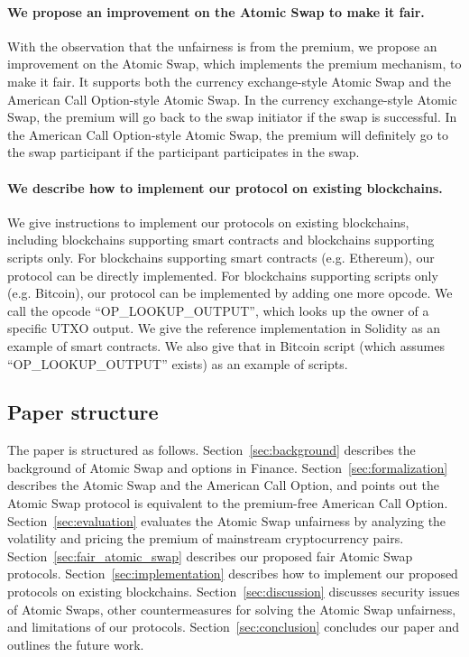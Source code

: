 \paragraph{We propose an improvement on the Atomic Swap to make it fair.}
With the observation that the unfairness is from the premium,
we propose an improvement on the Atomic Swap, which implements the premium mechanism, to make it fair.
It supports both the currency exchange-style Atomic Swap and the American Call Option-style Atomic Swap.
In the currency exchange-style Atomic Swap, the premium will go back to the swap initiator if the swap is successful.
In the American Call Option-style Atomic Swap, the premium will definitely go to the swap participant if the participant participates in the swap.


\paragraph{We describe how to implement our protocol on existing blockchains.}
We give instructions to implement our protocols on existing blockchains,
including blockchains supporting smart contracts and blockchains supporting scripts only.
For blockchains supporting smart contracts (e.g. Ethereum), our protocol can be directly implemented.
For blockchains supporting scripts only (e.g. Bitcoin), our protocol can be implemented by adding one more opcode.
We call the opcode ``OP\_LOOKUP\_OUTPUT'', which looks up the owner of a specific UTXO output.
We give the reference implementation in Solidity as an example of smart contracts.
We also give that in Bitcoin script (which assumes ``OP\_LOOKUP\_OUTPUT'' exists) as an example of scripts.










\subsection{Paper structure}

The paper is structured as follows.
Section~\ref{sec:background} describes the background of Atomic Swap and options in Finance.
Section~\ref{sec:formalization} describes the Atomic Swap and the American Call Option, and points out the Atomic Swap protocol is equivalent to the premium-free American Call Option.
Section~\ref{sec:evaluation} evaluates the Atomic Swap unfairness by analyzing the volatility and pricing the premium of mainstream cryptocurrency pairs.
Section~\ref{sec:fair_atomic_swap} describes our proposed fair Atomic Swap protocols.
Section~\ref{sec:implementation} describes how to implement our proposed protocols on existing blockchains.
Section~\ref{sec:discussion} discusses security issues of Atomic Swaps, other countermeasures for solving the Atomic Swap unfairness, and limitations of our protocols.
Section~\ref{sec:conclusion} concludes our paper and outlines the future work.
